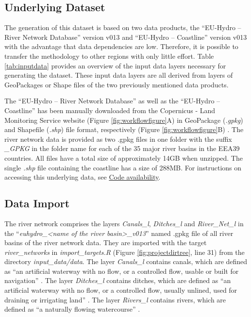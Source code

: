 \documentclass[fleqn,10pt]{wlscirep}
\begin{document}
\hypertarget{underlying-dataset}{%
\subsection*{Underlying Dataset}\label{underlying-dataset}}

The generation of this dataset is based on two data products, the ``EU-Hydro -- River Network Database'' version v013\cite{noauthor_eu-hydro_2021} and ``EU-Hydro -- Coastline'' version v013\cite{noauthor_eu-hydro_2021-1} with the advantage that data dependencies are low. Therefore, it is possible to transfer the methodology to other regions with only little effort. Table \ref{tab:inputdata} provides an overview of the input data layers necessary for generating the dataset. These input data layers are all derived from layers of GeoPackages or Shape files of the two previously mentioned data products.

The ``EU-Hydro -- River Network Database''\cite{noauthor_eu-hydro_2021} as well as the ``EU-Hydro -- Coastline''\cite{noauthor_eu-hydro_2021-1} has been manually downloaded from the Copernicus - Land Monitoring Service website (Figure \ref{fig:workflowfigure}A) in GeoPackage (\emph{.gpkg}) and Shapefile (\emph{.shp}) file format, respectively (Figure \ref{fig:workflowfigure}B) \cite{noauthor_eu-hydro_2021, noauthor_eu-hydro_2021-1}. The river network data is provided as two .gpkg files in one folder with the suffix \emph{\_GPKG} in the folder name for each of the 35 major river basins in the EEA39 countries. All files have a total size of approximately 14GB when unzipped. The single \emph{.shp} file containing the coastline has a size of 288MB. For instructions on accessing this underlying data, see \protect\hyperlink{code-availability}{Code availability}.

\hypertarget{data-import}{%
\subsection*{Data Import}\label{data-import}}

The river network comprises the layers \emph{Canals\_l}, \emph{Ditches\_l} and \emph{River\_Net\_l} in the ``\emph{euhydro\_\textless name of the river basin\textgreater\_v013}'' named .gpkg file of all river basins of the river network data. They are imported with the target \emph{river\_networks} in \emph{import\_targets.R} (Figure \ref{fig:projectdirtree}, line 31) from the directory \emph{input\_data/data}. The layer \emph{Canals\_l} contains canals, which are defined as ``an artificial waterway with no flow, or a controlled flow, usable or built for navigation'' \cite{gallaun_eu-hydro_2019}. The layer \emph{Ditches\_l} contains ditches, which are defined as ``an artificial waterway with no flow, or a controlled flow, usually unlined, used for draining or irrigating land'' \cite{gallaun_eu-hydro_2019}. The layer \emph{Rivers\_l} contains rivers, which are defined as ``a naturally flowing watercourse'' \cite{gallaun_eu-hydro_2019}.
\end{document}

